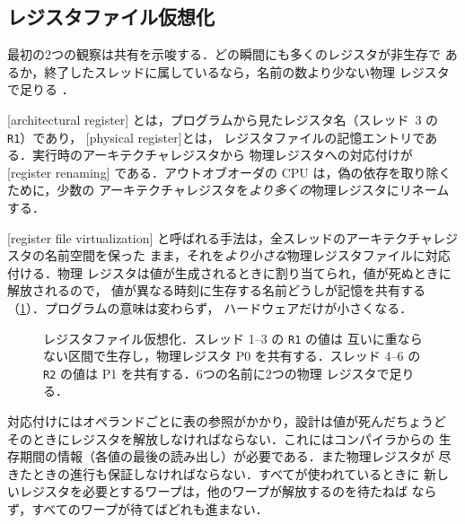 \documentclass[../main.tex]{subfiles}
\begin{document}
\subsection{レジスタファイル仮想化}

最初の2つの観察は共有を示唆する．どの瞬間にも多くのレジスタが非生存で
あるか，終了したスレッドに属しているなら，名前の数より少ない物理
レジスタで足りる \cite{jeon2015rfv}．

\begin{definition}[アーキテクチャレジスタと物理レジスタ]
  \label{def:l06-arch-phys}
  [architectural register]
  とは，プログラムから見たレジスタ名（スレッド~3 の \texttt{R1}）であり，
  [physical register]とは，
  レジスタファイルの記憶エントリである．実行時のアーキテクチャレジスタから
  物理レジスタへの対応付けが
  [register renaming]
  である．アウトオブオーダの CPU は，偽の依存を取り除くために，少数の
  アーキテクチャレジスタを\emph{より多くの}物理レジスタにリネームする．
\end{definition}

\begin{definition}[レジスタファイル仮想化]
  \label{def:l06-rf-virtualization}
  [register file virtualization]
  と呼ばれる手法は，全スレッドのアーキテクチャレジスタの名前空間を保った
  まま，それを\emph{より小さな}物理レジスタファイルに対応付ける．物理
  レジスタは値が生成されるときに割り当てられ，値が死ぬときに解放されるので，
  値が異なる時刻に生存する名前どうしが記憶を共有する
  （\cref{fig:l06-rf-virtualization}）．プログラムの意味は変わらず，
  ハードウェアだけが小さくなる．
\end{definition}

\begin{figure}[tb]
  \centering
  
  \caption{レジスタファイル仮想化．スレッド 1--3 の \texttt{R1} の値は
    互いに重ならない区間で生存し，物理レジスタ P0 を共有する．スレッド
    4--6 の \texttt{R2} の値は P1 を共有する．6つの名前に2つの物理
    レジスタで足りる．}
  \label{fig:l06-rf-virtualization}
\end{figure}

%
対応付けにはオペランドごとに表の参照がかかり，設計は値が死んだちょうど
そのときにレジスタを解放しなければならない．これにはコンパイラからの
生存期間の情報（各値の最後の読み出し）が必要である．また物理レジスタが
尽きたときの進行も保証しなければならない．すべてが使われているときに
新しいレジスタを必要とするワープは，他のワープが解放するのを待たねば
ならず，すべてのワープが待てばどれも進まない．
\end{document}
